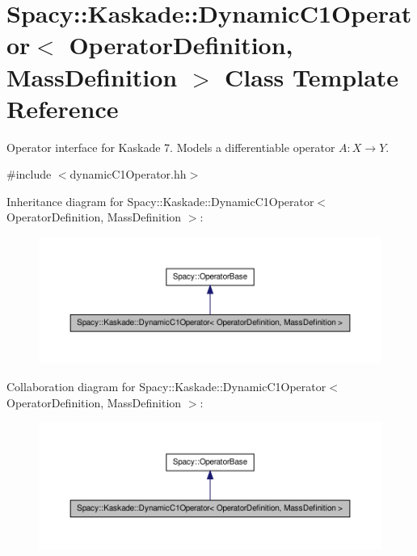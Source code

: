 \hypertarget{classSpacy_1_1Kaskade_1_1DynamicC1Operator}{\section{\-Spacy\-:\-:\-Kaskade\-:\-:\-Dynamic\-C1\-Operator$<$ \-Operator\-Definition, \-Mass\-Definition $>$ \-Class \-Template \-Reference}
\label{classSpacy_1_1Kaskade_1_1DynamicC1Operator}
}


\-Operator interface for \-Kaskade 7. \-Models a differentiable operator $A:X\rightarrow Y$.  




{\ttfamily \#include $<$dynamic\-C1\-Operator.\-hh$>$}



\-Inheritance diagram for \-Spacy\-:\-:\-Kaskade\-:\-:\-Dynamic\-C1\-Operator$<$ \-Operator\-Definition, \-Mass\-Definition $>$\-:
\nopagebreak
\begin{figure}[H]
\begin{center}
\leavevmode
\includegraphics[width=350pt]{classSpacy_1_1Kaskade_1_1DynamicC1Operator__inherit__graph}
\end{center}
\end{figure}


\-Collaboration diagram for \-Spacy\-:\-:\-Kaskade\-:\-:\-Dynamic\-C1\-Operator$<$ \-Operator\-Definition, \-Mass\-Definition $>$\-:
\nopagebreak
\begin{figure}[H]
\begin{center}
\leavevmode
\includegraphics[width=350pt]{classSpacy_1_1Kaskade_1_1DynamicC1Operator__coll__graph}
\end{center}
\end{figure}
